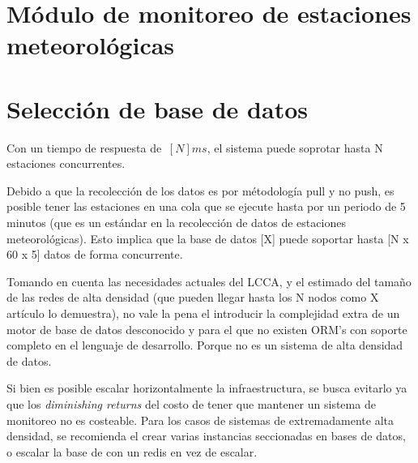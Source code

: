 \section{Módulo de monitoreo de estaciones meteorológicas}





\section{Selección de base de datos}





Con un tiempo de respuesta de $~[N]ms$, el sistema puede soprotar hasta N estaciones concurrentes.

Debido a que la recolección de los datos es por métodología pull y no push, es posible tener las estaciones en una cola que se ejecute hasta por un periodo de 5 minutos (que es un estándar en la recolección de datos de estaciones meteorológicas). Esto implica que la base de datos [X] puede soportar hasta [N x 60 x 5] datos de forma concurrente.

Tomando en cuenta las necesidades actuales del LCCA, y el estimado del tamaño de las redes de alta densidad (que pueden llegar hasta los N nodos como X artículo lo demuestra), no vale la pena el introducir la complejidad extra de un motor de base de datos desconocido y para el que no existen ORM's con soporte completo en el lenguaje de desarrollo. Porque no es un sistema de alta densidad de datos.

Si bien es posible escalar horizontalmente la infraestructura, se busca evitarlo ya que los \textit{diminishing returns} del costo de tener que mantener un sistema de monitoreo no es costeable. Para los casos de sistemas de extremadamente alta densidad, se recomienda el crear varias instancias seccionadas en bases de datos, o escalar la base de con un redis en vez de escalar.


